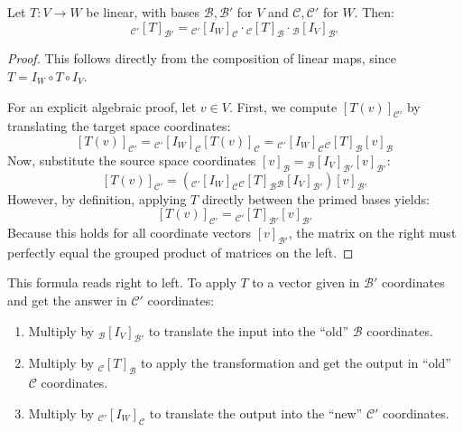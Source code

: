 \documentclass[../linear_algebra_and_groups.tex]{subfiles}
\begin{document}
\begin{theorem}
\label{thm:changeofbasis}
    \begin{shaded*}
        Let $T:V\to W$ be linear, with bases $\mathcal{B},\mathcal{B}'$ for $V$ and $\mathcal{C},\mathcal{C}'$ for $W$. Then:
        \[ {}_{\mathcal{C}'}[T]_{\mathcal{B}'} = {}_{\mathcal{C}'}[I_W]_{\mathcal{C}} \cdot {}_\mathcal{C}[T]_{\mathcal{B}} \cdot {}_\mathcal{B}[I_V]_{\mathcal{B}'} \]
    \end{shaded*}
\end{theorem}
\begin{proof}
    This follows directly from the composition of linear maps, since $T = I_W \circ T \circ I_V$.
    
    For an explicit algebraic proof, let $v \in V$. First, we compute $[T(v)]_{\mathcal{C}'}$ by translating the target space coordinates:
    \[ [T(v)]_{\mathcal{C}'} = {}_{\mathcal{C}'}[I_W]_\mathcal{C} [T(v)]_{\mathcal{C}} = {}_{\mathcal{C}'}[I_W]_{\mathcal{C}} {}_{\mathcal{C}}[T]_\mathcal{B} [v]_\mathcal{B} \]
    Now, substitute the source space coordinates $[v]_\mathcal{B} = {}_\mathcal{B}[I_V]_{\mathcal{B}'} [v]_{\mathcal{B}'}$:
    \[ [T(v)]_{\mathcal{C}'} = \left( {}_{\mathcal{C}'}[I_W]_{\mathcal{C}} {}_{\mathcal{C}}[T]_\mathcal{B} {}_\mathcal{B}[I_V]_{\mathcal{B}'} \right) [v]_{\mathcal{B}'} \]
    However, by definition, applying $T$ directly between the primed bases yields:
    \[ [T(v)]_{\mathcal{C}'} = {}_{\mathcal{C}'}[T]_{\mathcal{B}'} [v]_{\mathcal{B}'} \]
    Because this holds for all coordinate vectors $[v]_{\mathcal{B}'}$, the matrix on the right must perfectly equal the grouped product of matrices on the left.
    \qedhere
\end{proof}

\begin{remark}
    This formula reads right to left. To apply $T$ to a vector given in $\mathcal{B}'$ coordinates and get the answer in $\mathcal{C}'$ coordinates:
    \begin{enumerate}
        \item Multiply by ${}_\mathcal{B}[I_V]_{\mathcal{B}'}$ to translate the input into the ``old'' $\mathcal{B}$ coordinates.
        \item Multiply by ${}_\mathcal{C}[T]_\mathcal{B}$ to apply the transformation and get the output in ``old'' $\mathcal{C}$ coordinates.
        \item Multiply by ${}_{\mathcal{C}'}[I_W]_{\mathcal{C}}$ to translate the output into the ``new'' $\mathcal{C}'$ coordinates.
    \end{enumerate}
\end{remark}
\end{document}
